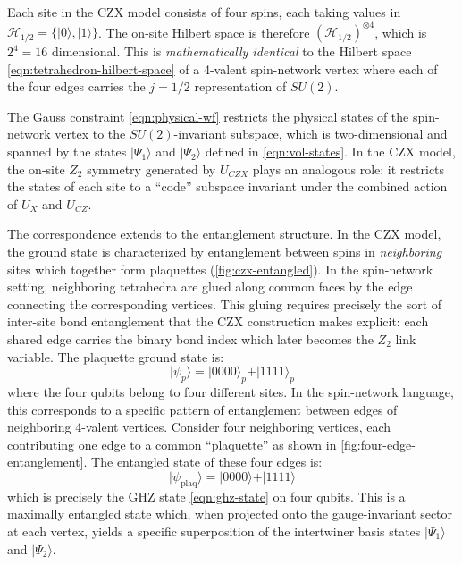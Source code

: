 \documentclass[preprint]{SciPost}
\newcommand{\mc}[1]{\mathcal{#1}}
\newcommand{\ket}[1]{\vert #1 \rangle}
\theoremstyle{plain} %
\begin{document}
Each site in the CZX model consists of four spins, each taking values in $ \mc{H}_{1/2} = \{ \ket{0}, \ket{1} \} $. The on-site Hilbert space is therefore $ (\mc{H}_{1/2})^{\otimes 4} $, which is $ 2^4 = 16 $ dimensional. This is \emph{mathematically identical} to the Hilbert space \eqref{eqn:tetrahedron-hilbert-space} of a 4-valent spin-network vertex where each of the four edges carries the $ j = 1/2 $ representation of $ SU(2) $.

The Gauss constraint \eqref{eqn:physical-wf} restricts the physical states of the spin-network vertex to the $ SU(2) $-invariant subspace, which is two-dimensional and spanned by the states $ \ket{\Psi_1} $ and $ \ket{\Psi_2} $ defined in \eqref{eqn:vol-states}. In the CZX model, the on-site $ Z_2 $ symmetry generated by $ U_{CZX} $ plays an analogous role: it restricts the states of each site to a ``code'' subspace invariant under the combined action of $ U_X $ and $ U_{CZ} $.

The correspondence extends to the entanglement structure. In the CZX model, the ground state is characterized by entanglement between spins in \emph{neighboring} sites which together form plaquettes (\autoref{fig:czx-entangled}). In the spin-network setting, neighboring tetrahedra are glued along common faces by the edge connecting the corresponding vertices. This gluing requires precisely the sort of inter-site bond entanglement that the CZX construction makes explicit: each shared edge carries the binary bond index which later becomes the $Z_2$ link variable. The plaquette ground state is:
\begin{equation}\label{eqn:czx-plaquette-state}
	\ket{\psi_p} = \ket{0000}_p + \ket{1111}_p
\end{equation}
where the four qubits belong to four different sites. In the spin-network language, this corresponds to a specific pattern of entanglement between edges of neighboring 4-valent vertices. Consider four neighboring vertices, each contributing one edge to a common ``plaquette'' as shown in \autoref{fig:four-edge-entanglement}. The entangled state of these four edges is:
\begin{equation}\label{eqn:sn-plaquette-state}
	\ket{\psi_{\text{plaq}}} = \ket{0000} + \ket{1111}
\end{equation}
which is precisely the GHZ state \eqref{eqn:ghz-state} on four qubits. This is a maximally entangled state which, when projected onto the gauge-invariant sector at each vertex, yields a specific superposition of the intertwiner basis states $ \ket{\Psi_1} $ and $ \ket{\Psi_2} $.
\end{document}
